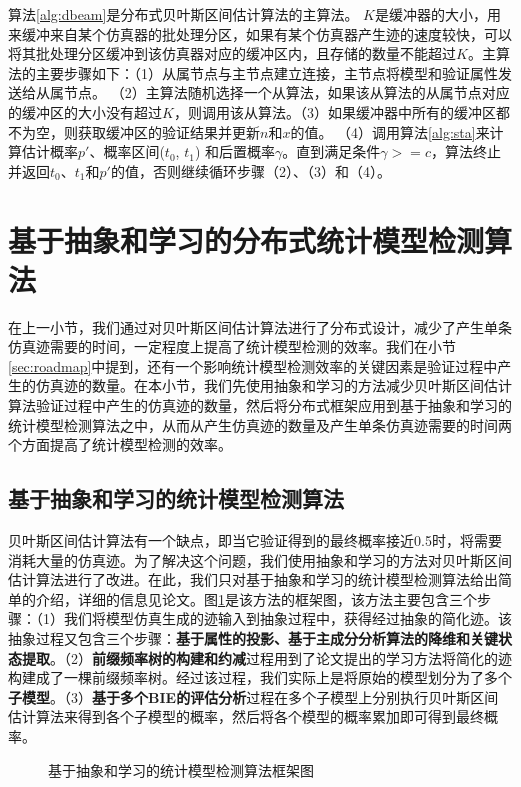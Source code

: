 算法\ref{alg:dbeam}是分布式贝叶斯区间估计算法的主算法。 \emph{$K$}是缓冲器的大小，用来缓冲来自某个仿真器的批处理分区，如果有某个仿真器产生迹的速度较快，可以将其批处理分区缓冲到该仿真器对应的缓冲区内，且存储的数量不能超过\emph{$K$}。主算法的主要步骤如下：（1）从属节点与主节点建立连接，主节点将模型和验证属性发送给从属节点。 （2）主算法随机选择一个从算法，如果该从算法的从属节点对应的缓冲区的大小没有超过\emph{$K$}，则调用该从算法。（3）如果缓冲器中所有的缓冲区都不为空，则获取缓冲区的验证结果并更新\emph{$n$}和\emph{$x$}的值。 （4）调用算法\ref{alg:sta}来计算估计概率$p'$、概率区间($t_0$, $t_1$) 和后置概率$\gamma$。直到满足条件$\gamma >= c$，算法终止并返回$t_0$、$t_1$和$p'$的值，否则继续循环步骤（2）、（3）和（4）。
\section{基于抽象和学习的分布式统计模型检测算法}
在上一小节，我们通过对贝叶斯区间估计算法进行了分布式设计，减少了产生单条仿真迹需要的时间，一定程度上提高了统计模型检测的效率。我们在小节\ref{sec:roadmap}中提到，还有一个影响统计模型检测效率的关键因素是验证过程中产生的仿真迹的数量。在本小节，我们先使用抽象和学习的方法减少贝叶斯区间估计算法验证过程中产生的仿真迹的数量，然后将分布式框架应用到基于抽象和学习的统计模型检测算法之中，从而从产生仿真迹的数量及产生单条仿真迹需要的时间两个方面提高了统计模型检测的效率。
\subsection{基于抽象和学习的统计模型检测算法}
贝叶斯区间估计算法有一个缺点，即当它验证得到的最终概率接近0.5时，将需要消耗大量的仿真迹\cite
{zhddh}。为了解决这个问题，我们使用抽象和学习的方法对贝叶斯区间估计算法进行了改进。在此，我们只对基于抽象和学习的统计模型检测算法给出简单的介绍，详细的信息见论文\cite{jiangkaiqiang2016}。图\ref{al-smc}是该方法的框架图，该方法主要包含三个步骤：（1）我们将模型仿真生成的迹输入到抽象过程中，获得经过抽象的简化迹。该抽象过程又包含三个步骤：\textbf{基于属性的投影、基于主成分分析算法的降维\cite{dunteman1989principal}和关键状态提取}。（2）\textbf{前缀频率树的构建和约减}过程用到了论文\cite{carrasco1994learning}提出的学习方法将简化的迹构建成了一棵前缀频率树。经过该过程，我们实际上是将原始的模型划分为了多个\textbf{子模型}。（3）\textbf{基于多个BIE的评估分析}过程在多个子模型上分别执行贝叶斯区间估计算法来得到各个子模型的概率，然后将各个模型的概率累加即可得到最终概率。
\begin{figure}[htbp]
	\caption{基于抽象和学习的统计模型检测算法框架图}\label{al-smc}
\end{figure}
